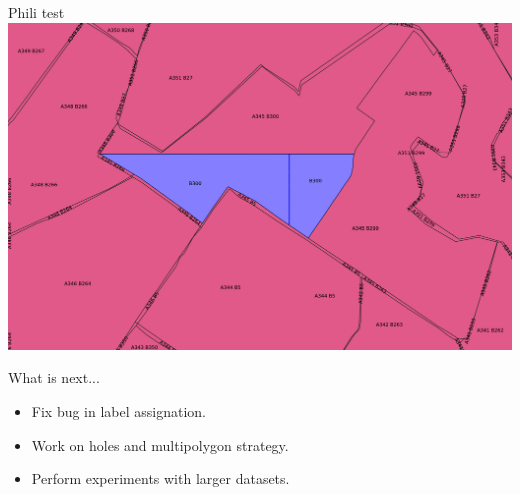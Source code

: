\documentclass{beamer}
\begin{document}
\begin{frame}{Phili test}
    \centering 
    \includegraphics[width=\linewidth]{figures/phili05} 
\end{frame}

\begin{frame}{What is next...}
    \begin{itemize}
        \item Fix bug in label assignation.
        \item Work on holes and multipolygon strategy.
        \item Perform experiments with larger datasets.
    \end{itemize}
\end{frame}
\end{document}

